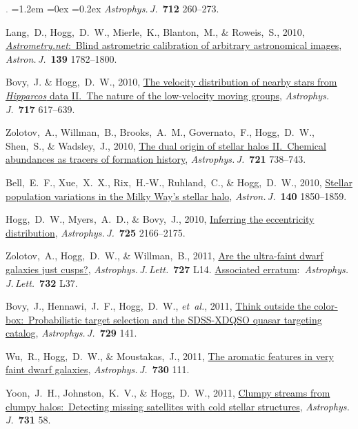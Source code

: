 \documentclass[10pt,letterpaper]{article}
\newcommand{\acronym}[1]{{\small{#1}}}
\newcommand{\foreign}[1]{\textsl{#1}}
\newcommand{\etal}{\foreign{et~al.}}
\newcommand{\project}[1]{\textsl{#1}}
\newcommand{\doi}[2]{\href{http://dx.doi.org/#1}{{#2}}}
\newcommand{\deemph}[1]{\textcolor{grey}{\footnotesize{#1}}}
\newcommand{\pubnumber}[1]{\deemph{{#1}.}}
\newcounter{refpubnum}
\newcommand{\hogglist}{%
    \rightmargin=0in
    \leftmargin=1.2em
    \topsep=0ex
    \partopsep=0pt
    \itemsep=0.2ex
    \parsep=0pt
    \itemindent=-1.0\leftmargin
    \listparindent=0.0\leftmargin
    \settowidth{\labelsep}{~}
    \usecounter{refpubnum}
  }
\begin{document}
\begin{list}{\pubnumber{\therefpubnum}}{\hogglist}
\textit{Astrophys.\,J.}\ \textbf{712} 260--273.
\item
Lang,~D., Hogg,~D.~W., Mierle,~K., Blanton,~M., \& Roweis,~S., 2010,
\doi{10.1088/0004-6256/139/5/1782}{\project{Astrometry.net}:\ Blind astrometric calibration of arbitrary astronomical images},
\textit{Astron.\,J.}\ \textbf{139} 1782--1800.
\item
Bovy,~J. \& Hogg,~D.~W., 2010,
\doi{10.1088/0004-637X/717/2/617}{The velocity distribution of nearby stars from \project{Hipparcos} data \acronym{II}.\ The nature of the low-velocity moving groups},
\textit{Astrophys.\,J.}\ \textbf{717} 617--639.
\item
Zolotov,~A., Willman,~B., Brooks,~A.~M., Governato,~F., Hogg,~D.~W., Shen,~S., \& Wadsley,~J., 2010,
\doi{10.1088/0004-637X/721/1/738}{The dual origin of stellar halos \acronym{II}.\ Chemical abundances as tracers of formation history},
\textit{Astrophys.\,J.}\ \textbf{721} 738--743.
\item
Bell,~E.~F., Xue,~X.~X., Rix,~H.-W., Ruhland,~C., \& Hogg,~D.~W., 2010,
\doi{10.1088/0004-6256/140/6/1850}{Stellar population variations in the Milky Way's stellar halo},
\textit{Astron.\,J.}\ \textbf{140} 1850--1859.
\item
Hogg,~D.~W., Myers,~A.~D., \& Bovy,~J., 2010,
\doi{10.1088/0004-637X/725/2/2166}{Inferring the eccentricity distribution},
\textit{Astrophys.\,J.}\ \textbf{725} 2166--2175.
\item
Zolotov,~A., Hogg,~D.~W., \& Willman,~B., 2011,
\doi{10.1088/2041-8205/727/1/L14}{Are the ultra-faint dwarf galaxies just cusps?},
\textit{Astrophys.\,J.\,Lett.}\ \textbf{727} L14.
\doi{10.1088/2041-8205/732/2/L37}{Associated erratum}:\ \textit{Astrophys.\,J.\,Lett.}\ \textbf{732} L37.
\item
Bovy,~J., Hennawi,~J.~F., Hogg,~D.~W., \etal, 2011,
\doi{10.1088/0004-637X/729/2/141}{Think outside the color-box:\ Probabilistic target selection and the \acronym{SDSS-XDQSO} quasar targeting catalog},
\textit{Astrophys.\,J.}\ \textbf{729} 141.
\item
Wu,~R., Hogg,~D.~W., \& Moustakas,~J., 2011,
\doi{10.1088/0004-637X/730/2/111}{The aromatic features in very faint dwarf galaxies},
\textit{Astrophys.\,J.}\ \textbf{730} 111.
\item
Yoon,~J.~H., Johnston,~K.~V., \& Hogg,~D.~W., 2011,
\doi{10.1088/0004-637X/731/1/58}{Clumpy streams from clumpy halos:\ Detecting missing satellites with cold stellar structures}, 
\textit{Astrophys.\,J.}\ \textbf{731} 58.
\item

\end{list}
\end{document}
